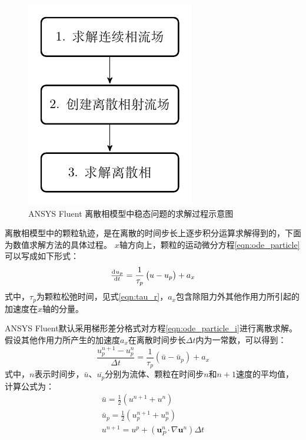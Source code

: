 \documentclass{ctexart}
\begin{document}
\begin{figure}
\centering
\includegraphics{./fig/dpm_flow}
\caption{ANSYS Fluent 离散相模型中稳态问题的求解过程示意图}
\label{fig:dpm_flow}
\end{figure}

离散相模型中的颗粒轨迹，是在离散的时间步长上逐步积分运算求解得到的，下面为数值求解方法的具体过程。
$x$轴方向上，颗粒的运动微分方程\eqref{eqn:ode_particle}可以写成如下形式：
\begin{equation}\label{eqn:ode_particle_i}
\od{u_{p}}{t} = \frac{1}{\tau_p}\left(u-u_{p}\right) +a_x
\end{equation}
式中，$\tau_p$为颗粒松弛时间，见式\eqref{eqn:tau_r}，$a_x$包含除阻力外其他作用力所引起的加速度在$x$轴的分量。

ANSYS Fluent\textregistered 默认采用梯形差分格式对方程\eqref{eqn:ode_particle_i}进行离散求解。
假设其他作用力所产生的加速度$a_x$在离散时间步长$\Delta t$内为一常数，可以得到：
\begin{equation}
\frac{u_{p}^{n+1}-u_{p}^{n}}{\Delta t} = \frac{1}{\tau_p} \left( \bar{u}-\bar{u}_{p}\right) + a_x
\end{equation}
式中，$n$表示时间步，$\bar{u}$、$\bar{u_p}$分别为流体、颗粒在时间步$n$和$n+1$速度的平均值，计算公式为：
\begin{equation}
\begin{split}
\bar{u} = \frac{1}{2} \left(u^{n+1}+u^{n}\right) \\ 
\bar{u}_p = \frac{1}{2} \left(u_p^{n+1}+u_p^{n}\right) \\
u^{n+1} = u^{p} +\left( \bm{u}_P^n\cdot \nabla \bm{u}^n \right) \Delta t 
\end{split}
\end{equation}
\end{document}

